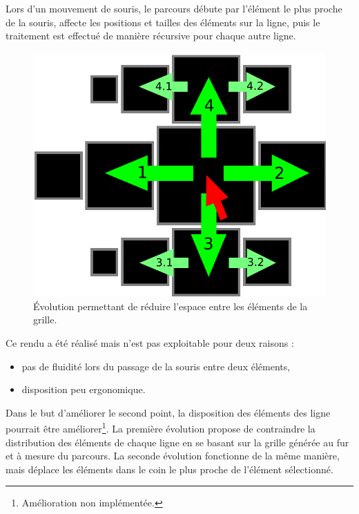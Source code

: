 Lors d'un mouvement de souris, le parcours débute par l'élément le plus proche de la souris, affecte les positions et tailles des éléments sur la ligne, puis le traitement est effectué de manière récursive pour chaque autre ligne.

\begin{figure}[H]
  \centering
  \includegraphics[width=\textwidth]{../resources/illustrations/seq_app_mouse}
  \caption{Évolution permettant de réduire l'espace entre les éléments de la grille.}
\end{figure}

Ce rendu a été réalisé mais n'est pas exploitable pour deux raisons :

\begin{itemize}
  \item pas de fluidité lors du passage de la souris entre deux éléments,
  \item disposition peu ergonomique.
\end{itemize}

Dans le but d'améliorer le second point, la disposition des éléments des ligne pourrait être améliorer\footnote{Amélioration non implémentée.}. La première évolution propose de contraindre la distribution des éléments de chaque ligne en se basant sur la grille générée au fur et à mesure du parcours. La seconde évolution fonctionne de la même manière, mais déplace les éléments dans le coin le plus proche de l'élément sélectionné.

